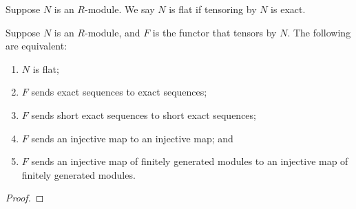 \begin{definition}
    Suppose \(N\) is an \(R\)-module.
    We say \(N\) is flat if tensoring by \(N\) is exact.
\end{definition}
\begin{lemma}
    Suppose \(N\) is an \(R\)-module,
    and \(F\) is the functor that tensors by \(N\).
    The following are equivalent:
    \begin{enumerate}[label={(\alph*)}, itemsep=0mm]
        \item \(N\) is flat;
        \item \(F\) sends exact sequences to exact sequences;
        \item \(F\) sends short exact sequences to short exact sequences;
        \item \(F\) sends an injective map to an injective map; and
        \item \(F\) sends an injective map of finitely generated modules
        to an injective map of finitely generated modules.
    \end{enumerate}
\end{lemma}
\begin{proof}
    
\end{proof}

